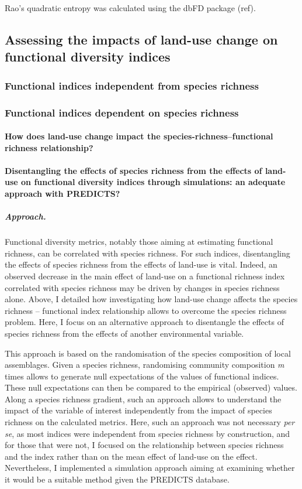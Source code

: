 Rao's quadratic entropy was calculated using the dbFD package (ref).

\subsection{Assessing the impacts of land-use change on functional diversity indices}

	\subsubsection{Functional indices independent from species richness}

	\subsubsection{Functional indices dependent on species richness}

		\paragraph{How does land-use change impact the species-richness--functional richness relationship?}

		\paragraph{Disentangling the effects of species richness from the effects of land-use on functional diversity indices through simulations: an adequate approach with PREDICTS?}

\subparagraph{Approach.}
Functional diversity metrics, notably those aiming at estimating functional richness, can be correlated with species richness. For such indices, disentangling the effects of species richness from the effects of land-use is vital. Indeed, an observed decrease in the main effect of land-use on a functional richness index correlated with species richness may be driven by changes in species richness alone. Above, I detailed how investigating how land-use change affects the species richness -- functional index relationship allows to overcome the species richness problem. Here, I focus on an alternative approach to disentangle the effects of species richness from the effects of another environmental variable.

This approach is based on the randomisation of the species composition of local assemblages. Given a species richness, randomising community composition \textit{m} times allows to generate null expectations of the values of functional indices. These null expectations can then be compared to the empirical (observed) values. Along a species richness gradient, such an approach allows to understand the impact of the variable of interest independently from the impact of species richness on the calculated metrics. Here, such an approach was not necessary \textit{per se}, as most indices were independent from species richness by construction, and for those that were not, I focused on the relationship between species richness and the index rather than on the mean effect of land-use on the effect. Nevertheless, I implemented a simulation approach aiming at examining whether it would be a suitable method given the PREDICTS database.

